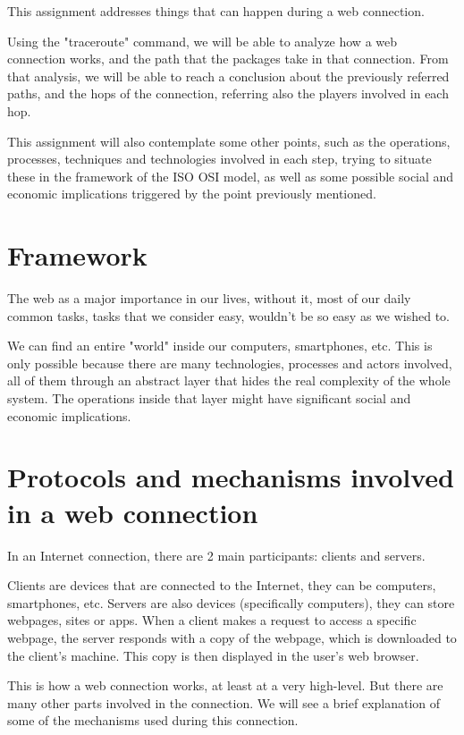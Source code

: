 \documentclass{article}
\newcommand\tab[1][1cm]{\hspace*{#1}}
\begin{document}
\tab This assignment addresses things that can happen during a web connection.

Using the "traceroute" command, we will be able to analyze how a web connection works, and the path that the packages take in that connection.
From that analysis, we will be able to reach a conclusion about the previously referred paths, and the hops of the connection, referring also the players involved in each hop.

This assignment will also contemplate some other points, such as the operations, processes, techniques and technologies involved in each step, trying to situate these in the framework of the ISO OSI model, as well as some possible social and economic implications triggered by the point previously mentioned.

\section{Framework}

The web as a major importance in our lives, without it, most of our daily common tasks, tasks that we consider easy, wouldn't be so easy as we wished to. 

We can find an entire "world" inside our computers, smartphones, etc. This is only possible because there are many technologies, processes and actors involved, all of them through an abstract layer that hides the real complexity of the whole system. The operations inside that layer might have significant social and economic implications.

\section{Protocols and mechanisms involved in a web connection}

\tab In an Internet connection, there are 2 main participants: clients and servers.

Clients are devices that are connected to the Internet, they can be computers, smartphones, etc. Servers are also devices (specifically computers), they can store webpages, sites or apps. 
When a client makes a request to access a specific webpage, the server responds with a copy of the webpage, which is downloaded to the client's machine. This copy is then displayed in the user's web browser.

This is how a web connection works, at least at a very high-level. But there are many other parts involved in the connection. We will see a brief explanation of some of the mechanisms used during this connection.
\end{document}
